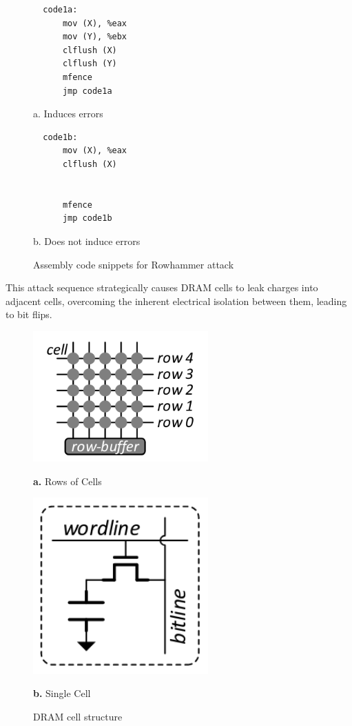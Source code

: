   \begin{figure}[H]
    \begin{minipage}{0.5\textwidth}
      \begin{verbatim}
  code1a:
      mov (X), %eax
      mov (Y), %ebx
      clflush (X)
      clflush (Y)
      mfence
      jmp code1a
      \end{verbatim}
      \caption*{a. Induces errors}
    \end{minipage}%
    \begin{minipage}{0.5\textwidth}
      \begin{verbatim}
  code1b:
      mov (X), %eax
      clflush (X)


      mfence
      jmp code1b
      \end{verbatim}
      \caption*{b. Does not induce errors}
    \end{minipage}
    \caption{Assembly code snippets for Rowhammer attack\cite{kimFlippingBitsMemory2014}}
  \end{figure}

This attack sequence strategically causes DRAM cells to leak charges
into adjacent cells, overcoming the inherent electrical isolation
between them, leading to bit flips. 

\begin{figure}[H]
  \centering
  \begin{minipage}{0.4\textwidth}
    \includegraphics[width=0.6\textwidth]{images/cellrows.png}
    \caption*{\textbf{a.} Rows of Cells}
  \end{minipage}%
  \begin{minipage}{0.3\textwidth}
    \includegraphics[width=0.6\textwidth]{images/singlecell.png}
    \caption*{\textbf{b.} Single Cell}
  \end{minipage}
  \caption{DRAM cell structure\cite{kimFlippingBitsMemory2014}}
\end{figure}

